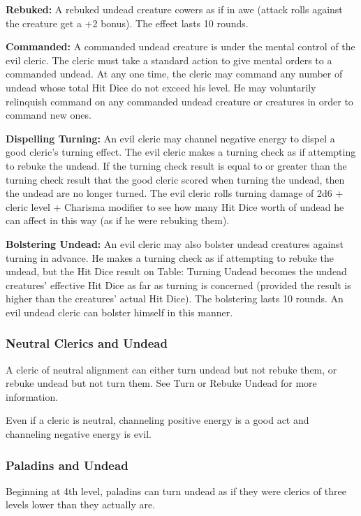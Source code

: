 \textbf{Rebuked:} A rebuked undead creature cowers as if in awe (attack rolls against 
the creature get a +2 bonus). The effect lasts 10 rounds.

\textbf{Commanded:} A commanded undead creature is under the mental control of 
the evil cleric. The cleric must take a standard action to give mental orders to 
a commanded undead. At any one time, the cleric may command any number of undead 
whose total Hit Dice do not exceed his level. He may voluntarily relinquish command 
on any commanded undead creature or creatures in order to command new ones.

\textbf{Dispelling Turning:} An evil cleric may channel negative energy to dispel 
a good cleric's turning effect. The evil cleric makes a turning check as if attempting 
to rebuke the undead. If the turning check result is equal to or greater than the 
turning check result that the good cleric scored when turning the undead, then 
the undead are no longer turned. The evil cleric rolls turning damage of 2d6 + 
cleric level + Charisma modifier to see how many Hit Dice worth of undead he can 
affect in this way (as if he were rebuking them).

\textbf{Bolstering Undead:} An evil cleric may also bolster undead creatures against 
turning in advance. He makes a turning check as if attempting to rebuke the undead, 
but the Hit Dice result on Table: Turning Undead becomes the undead creatures' 
effective Hit Dice as far as turning is concerned (provided the result is higher 
than the creatures' actual Hit Dice). The bolstering lasts 10 rounds. An evil undead 
cleric can bolster himself in this manner.

\subsubsection{Neutral Clerics and Undead}

A cleric of neutral alignment can either turn undead but not rebuke them, or rebuke 
undead but not turn them. See Turn or Rebuke Undead for more information.

Even if a cleric is neutral, channeling positive energy is a good act and channeling 
negative energy is evil.

\subsubsection{Paladins and Undead}

Beginning at 4th level, paladins can turn undead as if they were clerics of three 
levels lower than they actually are.

